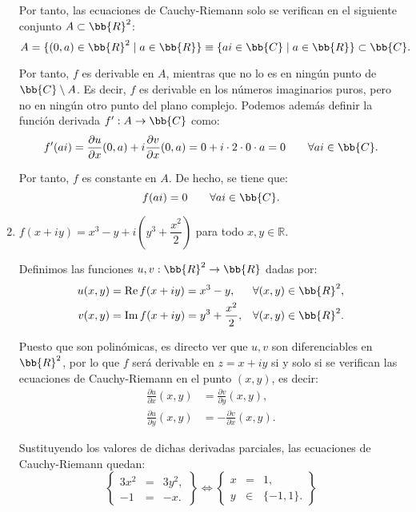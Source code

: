 \begin{ejercicio}
\begin{enumerate}
        Por tanto, las ecuaciones de Cauchy-Riemann solo se verifican en el siguiente conjunto $A\subset \bb{R}^2$:
        \[
            A = \{(0,a)\in\bb{R}^2\mid a\in\bb{R}\}\equiv
            \{ai\in\bb{C}\mid a\in\bb{R}\}\subset \bb{C}.
        \]
        
        Por tanto, $f$ es derivable en $A$, mientras que no lo es en ningún punto de $\bb{C}\setminus A$. Es decir, $f$ es derivable en los números imaginarios puros, pero no en ningún otro punto del plano complejo.
        Podemos además definir la función derivada $f':A\to\bb{C}$ como:
        \[
            f'(ai) = \dfrac{\partial u}{\partial x}(0,a) + i\dfrac{\partial v}{\partial x}(0,a) = 0+i\cdot 2\cdot 0 \cdot a = 0\qquad \forall ai\in \bb{C}.
        \]

        Por tanto, $f$ es constante en $A$. De hecho, se tiene que:
        \[
            f(ai) = 0\qquad \forall ai\in \bb{C}.
        \]



        \item $f(x + iy) = x^3 - y + i\left(y^3 + \dfrac{x^2}{2}\right)$ para todo $x, y \in \mathbb{R}$.
        
        Definimos las funciones $u,v:\bb{R}^2\to\bb{R}$ dadas por:
        \begin{align*}
            u(x,y) &= \Re f(x+iy) = x^3 - y,&\forall (x,y)\in\bb{R}^2,\\
            v(x,y) &= \Im f(x+iy) = y^3 + \frac{x^2}{2},&\forall (x,y)\in\bb{R}^2.
        \end{align*}

        Puesto que son polinómicas, es directo ver que $u,v$ son diferenciables en $\bb{R}^2$, por lo que $f$ será derivable en $z=x+iy$ si y solo si se verifican las ecuaciones de Cauchy-Riemann en el punto $(x,y)$, es decir:
        \begin{align*}
            \frac{\partial u}{\partial x}(x,y) &= \frac{\partial v}{\partial y}(x,y),\\
            \frac{\partial u}{\partial y}(x,y) &= -\frac{\partial v}{\partial x}(x,y).
        \end{align*}

        Sustituyendo los valores de dichas derivadas parciales, las ecuaciones de Cauchy-Riemann quedan:
        \begin{equation*}
            \left\{
                \begin{array}{rcl}
                    3x^2 &=& 3y^2,\\
                    -1 &=& -x.
                \end{array}
            \right\}
            \iff
            \left\{
                \begin{array}{rcl}
                    x &=& 1,\\
                    y &\in& \{-1,1\}.
                \end{array}
            \right\}
        \end{equation*}


\end{enumerate}
\end{ejercicio}
